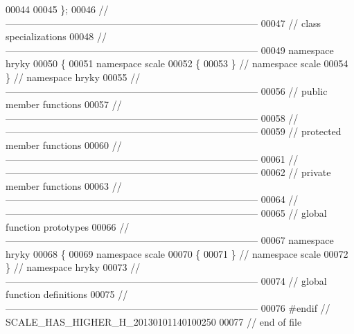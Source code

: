 \begin{DoxyCode}
00044 
00045 \};
00046 \textcolor{comment}{//
      ------------------------------------------------------------------------------}
00047 \textcolor{comment}{// class specializations}
00048 \textcolor{comment}{//
      ------------------------------------------------------------------------------}
00049 \textcolor{keyword}{namespace }hryky
00050 \{
00051 \textcolor{keyword}{namespace }scale
00052 \{
00053 \} \textcolor{comment}{// namespace scale}
00054 \} \textcolor{comment}{// namespace hryky}
00055 \textcolor{comment}{//
      ------------------------------------------------------------------------------}
00056 \textcolor{comment}{// public member functions}
00057 \textcolor{comment}{//
      ------------------------------------------------------------------------------}
00058 \textcolor{comment}{//
      ------------------------------------------------------------------------------}
00059 \textcolor{comment}{// protected member functions}
00060 \textcolor{comment}{//
      ------------------------------------------------------------------------------}
00061 \textcolor{comment}{//
      ------------------------------------------------------------------------------}
00062 \textcolor{comment}{// private member functions}
00063 \textcolor{comment}{//
      ------------------------------------------------------------------------------}
00064 \textcolor{comment}{//
      ------------------------------------------------------------------------------}
00065 \textcolor{comment}{// global function prototypes}
00066 \textcolor{comment}{//
      ------------------------------------------------------------------------------}
00067 \textcolor{keyword}{namespace }hryky
00068 \{
00069 \textcolor{keyword}{namespace }scale
00070 \{
00071 \} \textcolor{comment}{// namespace scale}
00072 \} \textcolor{comment}{// namespace hryky}
00073 \textcolor{comment}{//
      ------------------------------------------------------------------------------}
00074 \textcolor{comment}{// global function definitions}
00075 \textcolor{comment}{//
      ------------------------------------------------------------------------------}
00076 \textcolor{preprocessor}{#endif // SCALE\_HAS\_HIGHER\_H\_20130101140100250}
00077 \textcolor{preprocessor}{}\textcolor{comment}{// end of file}
\end{DoxyCode}
